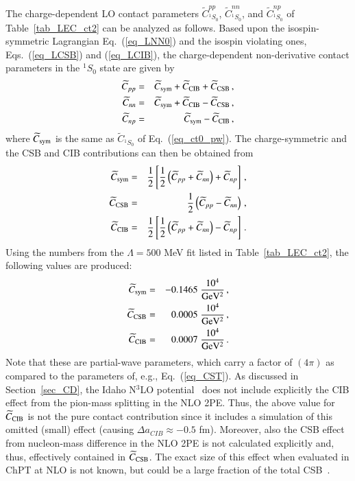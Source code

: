 \documentclass[sort&compress,preprint,3p]{elsarticle}
\begin{document}
The charge-dependent LO contact parameters 
 $\widetilde{C}_{^1S_0}^{pp}$, $\widetilde{C}_{^1S_0}^{nn}$, and $\widetilde{C}_{^1S_0}^{np}$
of Table~\ref{tab_LEC_ct2} can be analyzed as follows.
Based upon the isospin-symmetric Lagrangian Eq.~(\ref{eq_LNN0}) and the
isospin violating ones, Eqs.~(\ref{eq_LCSB}) and (\ref{eq_LCIB}),
the charge-dependent non-derivative contact parameters in the $^1S_0$ state are given by
\begin{eqnarray}
\widetilde{C}_{pp} & = &  \widetilde{C}_{\rm sym} + \widetilde{C}_{\rm CIB} + \widetilde{C}_{\rm CSB} \,, \\
\widetilde{C}_{nn} & = &  \widetilde{C}_{\rm sym} + \widetilde{C}_{\rm CIB} - \widetilde{C}_{\rm CSB} \,, \\
\widetilde{C}_{np} & = &  \widetilde{C}_{\rm sym} - \widetilde{C}_{\rm CIB} \,,
\end{eqnarray}
where   $\widetilde{C}_{\rm sym}$ is the same as $\widetilde{C}_{^1S_0}$ of Eq.~(\ref{eq_ct0_pw}).
The charge-symmetric and the CSB and CIB contributions can then
be obtained from
\begin{eqnarray}
\widetilde{C}_{\rm sym} & = & \frac12 \left[ \frac12 \left( \widetilde{C}_{ pp} + \widetilde{C}_{nn} \right)
 + \widetilde{C}_{np} \right] \,, \\
\widetilde{C}_{\rm CSB} & = & \frac12 \left( \widetilde{C}_{ pp} - \widetilde{C}_{nn} \right) \,, \\
\widetilde{C}_{\rm CIB} & = & \frac12 \left[ \frac12 \left( \widetilde{C}_{ pp} + \widetilde{C}_{nn} \right)
 - \widetilde{C}_{np} \right] \,. 
\end{eqnarray}
Using the numbers from the $\Lambda = 500$ MeV fit listed in Table~\ref{tab_LEC_ct2}, 
the following values are produced: 
\begin{eqnarray}
\widetilde{C}_{\rm sym} & = &  -0.1465 \; \frac{10^4}{\rm GeV^2} \,, \\
\widetilde{C}_{\rm CSB} & = & 0.0005 \; \frac{10^4}{\rm GeV^2} \,, \\
\widetilde{C}_{\rm CIB} & = & 0.0007 \; \frac{10^4}{\rm GeV^2}  \,. 
\end{eqnarray}
Note that these are partial-wave parameters, which carry a factor of $(4\pi)$ as compared to
the parameters of, e.g., Eq.~(\ref{eq_CST}).
As discussed in Section~\ref{sec_CD}, the Idaho N$^3$LO potential~\cite{EM03}
does not include explicitly the CIB effect from the pion-mass splitting in the NLO 2PE.
Thus, the above value for $\widetilde{C}_{\rm CIB}$ is not the pure contact contribution since it includes 
a simulation of this omitted (small) effect (causing $\Delta a_{CIB} \approx -0.5$ fm).
Moreover, also the CSB effect from nucleon-mass difference in the NLO 2PE
is not calculated explicitly and, thus, effectively contained in  $\widetilde{C}_{\rm CSB}$.
The exact size of this effect when evaluated in ChPT at NLO is not known, 
but could be a large fraction of the total CSB~\cite{LM98a}.
\end{document}
